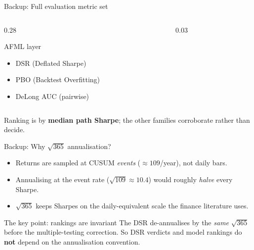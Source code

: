 \documentclass[aspectratio=169, t]{beamer}
\begin{document}
\begin{frame}{Backup: Full evaluation metric set}
\begin{columns}[T]
\begin{column}{0.28\textwidth}
{
\begin{block}{AFML layer}
\scriptsize
\begin{itemize}\setlength{\itemsep}{1pt}
  \item DSR (Deflated Sharpe)
  \item PBO (Backtest Overfitting)
  \item DeLong AUC (pairwise)
\end{itemize}
\end{block}
}
\end{column}
\begin{column}{0.03\textwidth}\hfill\end{column}
\end{columns}

\vspace{1.5em}
\centering
{\footnotesize Ranking is by \textbf{median path Sharpe}; the other families corroborate rather than decide.}
\end{frame}


\begin{frame}{Backup: Why $\sqrt{365}$ annualisation?}
\vspace{-0.4em}

\begin{itemize}\footnotesize
  \item Returns are sampled at CUSUM \emph{events} ($\approx 109$/year), not daily bars.
  \item Annualising at the event rate ($\sqrt{109} \approx 10.4$) would roughly \emph{halve} every Sharpe.
  \item $\sqrt{365}$ keeps Sharpes on the daily-equivalent scale the finance literature uses.
\end{itemize}

\vspace{0.5em}
{
\begin{block}{The key point: rankings are invariant}
\footnotesize
The DSR de-annualises by the \emph{same} $\sqrt{365}$ before the multiple-testing correction. So DSR verdicts and model rankings do \textbf{not} depend on the annualisation convention.
\end{block}
}
\end{frame}
\end{document}
